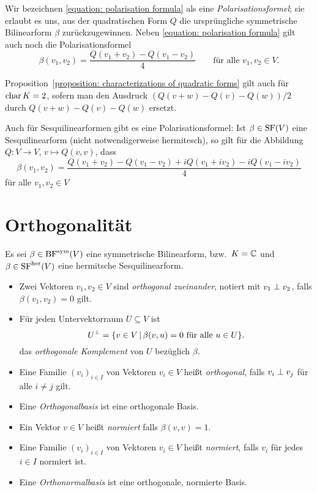 Wir bezeichnen \eqref{equation: polarisation formula} als eine \emph{Polarisationsformel};
sie erlaubt es uns, aus der quadratischen Form $Q$ die ursprüngliche symmetrische Bilinearform $\beta$ zurückzugewinnen.
Neben \eqref{equation: polarisation formula} gilt auch noch die Polarisationsformel
\[
    \beta(v_1, v_2)
  = \frac{Q(v_1 + v _2) - Q(v_1 - v_2)}{4}
  \qquad
  \text{für alle $v_1, v_2 \in V$}.
\]


\begin{remark}
  Proposition~\ref{proposition: characterizations of quadratic forms} gilt auch für $\operatorname{char} K = 2$, sofern man den Ausdruck $(Q(v+w) - Q(v) - Q(w))/2$ durch $Q(v+w) - Q(v) - Q(w)$ ersetzt.
\end{remark}

Auch für Sesquilinearformen gibt es eine Polarisationsformel:
Ist $\beta \in \operatorname{SF}(V)$ eine Sesquilinearform (nicht notwendigerweise hermitesch), so gilt für die Abbildung $Q \colon V \to V$, $v \mapsto Q(v,v)$, dass
\[
    \beta(v_1, v_2)
  = \frac{Q(v_1 + v_2) - Q(v_1 - v_2) + i Q(v_1 + i v_2) - i Q(v_1 - i v_2)}{4}
\]
für alle $v_1, v_2 \in V$






\section{Orthogonalität}

Es sei $\beta \in \operatorname{BF}^{\operatorname{sym}}(V)$ eine symmetrische Bilinearform, bzw.\ $K = \mathbb{C}$ und $\beta \in \operatorname{SF}^{\operatorname{her}}(V)$ eine hermitsche Sesquilinearform.

\begin{definition}
  \leavevmode
  \begin{itemize}
    \item
      Zwei Vektoren $v_1, v_2 \in V$ sind \emph{orthogonal zueinander}, notiert mit $v_1 \mathrel{\perp} v_2$, falls $\beta(v_1, v_2) = 0$ gilt.
    \item
      Für jeden Untervektorraum $U \subseteq V$ ist
      \[
          U^\perp
        = \{
            v \in V
          \,|\,
            \text{$\beta(v,u) = 0$ für alle $u \in U$}
          \}.
      \]
      das \emph{orthogonale Komplement} von $U$ bezüglich $\beta$.
    \item
      Eine Familie $(v_i)_{i \in I}$ von Vektoren $v_i \in V$ heißt \emph{orthogonal}, falls $v_i \mathrel{\perp} v_j$ für alle $i \neq j$ gilt.
    \item
      Eine \emph{Orthogonalbasis} ist eine orthogonale Basis.
    \item
      Ein Vektor $v \in V$ heißt \emph{normiert} falls $\beta(v,v) = 1$.
    \item
      Eine Familie $(v_i)_{i \in I}$ von Vektoren $v_i \in V$ heißt \emph{normiert}, falls $v_i$ für jedes $i \in I$ normiert ist.
    \item
      Eine \emph{Orthonormalbasis} ist eine orthogonale, normierte Basis.
  \end{itemize}
\end{definition}